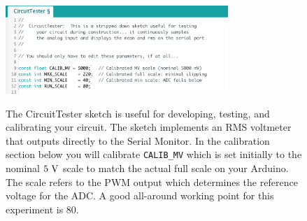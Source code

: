 \documentclass[12pt]{article}
\begin{document}
\begin{figure}[htbp]
\begin{center}
{\includegraphics[width=0.75\textwidth]{figs/test_circuit.png}}\\
\end{center}
\caption{\label{fig:sketches}  The CircuitTester sketch is useful for developing, testing, and calibrating your circuit.  The sketch implements an RMS voltmeter that outputs directly to the Serial Monitor.  In the calibration section below you will calibrate {\tt CALIB\_MV} which is set initially to the nominal $5~\rm V$ scale to match the actual full scale on your Arduino.  The scale refers to the PWM output which determines the reference voltage for the ADC.  A good all-around working point for this experiment is 80.}
\end{figure}
\end{document}
